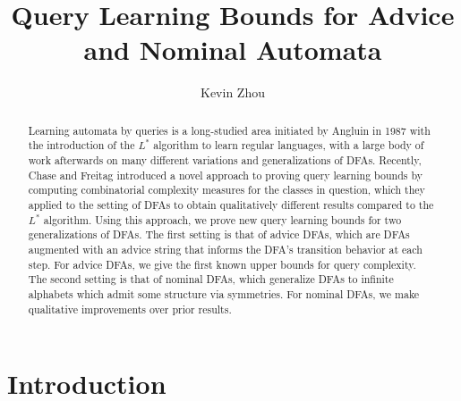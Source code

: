 \documentclass[runningheads]{llncs}
\begin{document}
%
\title{Query Learning Bounds for Advice and Nominal Automata}
%
%
\author{Kevin Zhou}
%
%

%
\maketitle              %
%
\begin{abstract}
Learning automata by queries is a long-studied area initiated by Angluin in 1987 with the introduction of the $L^*$ algorithm to learn regular languages, with a large body of work afterwards on many different variations and generalizations of DFAs.
Recently, Chase and Freitag introduced a novel approach to proving query learning bounds by computing combinatorial complexity measures for the classes in question, which they applied to the setting of DFAs to obtain qualitatively different results compared to the $L^*$ algorithm.
Using this approach, we prove new query learning bounds for two generalizations of DFAs.
The first setting is that of advice DFAs, which are DFAs augmented with an advice string that informs the DFA's transition behavior at each step.
For advice DFAs, we give the first known upper bounds for query complexity.
The second setting is that of nominal DFAs, which generalize DFAs to infinite alphabets which admit some structure via symmetries.
For nominal DFAs, we make qualitative improvements over prior results.

\end{abstract}
%
%
%
\section{Introduction}
\end{document}
